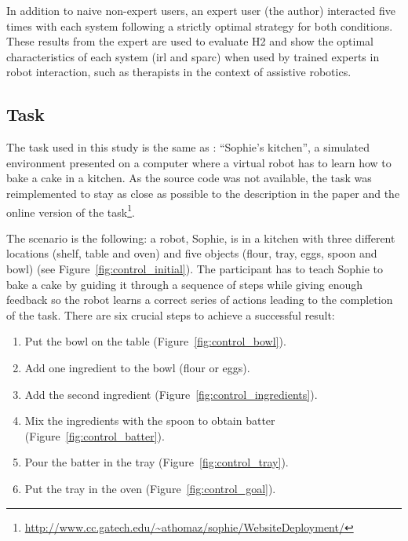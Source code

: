 In addition to naive non-expert users, an expert user (the author) interacted five times with each system following a strictly optimal strategy for both conditions. These results from the expert are used to evaluate H2 and show the optimal characteristics of each system (\gls{irl} and \gls{sparc}) when used by trained experts in robot interaction, such as therapists in the context of assistive robotics.


\subsection{Task} \label{ssec:control_task}

The task used in this study is the same as \cite{thomaz2008teachable}: ``Sophie's kitchen'', a simulated environment presented on a computer where a virtual robot has to learn how to bake a cake in a kitchen. As the source code was not available, the task was reimplemented to stay as close as possible to the description in the paper and the online version of the task\footnote{\url{http://www.cc.gatech.edu/~athomaz/sophie/WebsiteDeployment/}}.

The scenario is the following: a robot, Sophie, is in a kitchen with three different locations (shelf, table and oven) and five objects (flour, tray, eggs, spoon and bowl) (see Figure~\ref{fig:control_initial}). The participant has to teach Sophie to bake a cake by guiding it through a sequence of steps while giving enough feedback so the robot learns a correct series of actions leading to the completion of the task. There are six crucial steps to achieve a successful result:

\begin{enumerate}
	\item Put the bowl on the table (Figure~\ref{fig:control_bowl}).
	\item Add one ingredient to the bowl (flour or eggs).
	\item Add the second ingredient (Figure~\ref{fig:control_ingredients}).
	\item Mix the ingredients with the spoon to obtain batter (Figure~\ref{fig:control_batter}).
	\item Pour the batter in the tray (Figure~\ref{fig:control_tray}).
	\item Put the tray in the oven (Figure~\ref{fig:control_goal}).
\end{enumerate}

